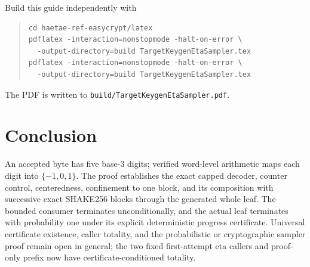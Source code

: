 \documentclass[11pt]{article}
\theoremstyle{definition}
\theoremstyle{plain}
\theoremstyle{remark}
\newcommand{\code}[1]{\nolinkurl{#1}}
\begin{document}
Build this guide independently with
\begin{quote}
\begin{verbatim}
cd haetae-ref-easycrypt/latex
pdflatex -interaction=nonstopmode -halt-on-error \
  -output-directory=build TargetKeygenEtaSampler.tex
pdflatex -interaction=nonstopmode -halt-on-error \
  -output-directory=build TargetKeygenEtaSampler.tex
\end{verbatim}
\end{quote}
The PDF is written to \code{build/TargetKeygenEtaSampler.pdf}.

\section*{Conclusion}

An accepted byte has five base-3 digits; verified word-level arithmetic maps
each digit into $\{-1,0,1\}$.  The proof establishes the exact capped decoder,
counter control, centeredness, confinement to one block, and its composition
with successive exact SHAKE256 blocks through the generated whole leaf.  The
bounded consumer terminates unconditionally, and the actual leaf terminates
with probability one under its explicit deterministic progress certificate.
Universal certificate existence, caller totality, and the probabilistic or
cryptographic sampler proof remain open in general; the two fixed
first-attempt eta callers and proof-only prefix now have
certificate-conditioned totality.
\end{document}
